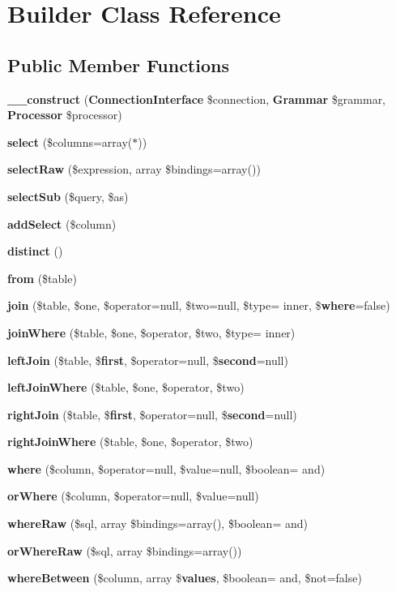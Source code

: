 \section{Builder Class Reference}
\label{class_illuminate_1_1_database_1_1_query_1_1_builder}
\subsection*{Public Member Functions}
\begin{DoxyCompactItemize}
\item 
{\bf \+\_\+\+\_\+construct} ({\bf Connection\+Interface} \$connection, {\bf Grammar} \$grammar, {\bf Processor} \$processor)
\item 
{\bf select} (\$columns=array(\textquotesingle{}$\ast$\textquotesingle{}))
\item 
{\bf select\+Raw} (\$expression, array \$bindings=array())
\item 
{\bf select\+Sub} (\$query, \$as)
\item 
{\bf add\+Select} (\$column)
\item 
{\bf distinct} ()
\item 
{\bf from} (\$table)
\item 
{\bf join} (\$table, \$one, \$operator=null, \$two=null, \$type= \textquotesingle{}inner\textquotesingle{}, \${\bf where}=false)
\item 
{\bf join\+Where} (\$table, \$one, \$operator, \$two, \$type= \textquotesingle{}inner\textquotesingle{})
\item 
{\bf left\+Join} (\$table, \${\bf first}, \$operator=null, \${\bf second}=null)
\item 
{\bf left\+Join\+Where} (\$table, \$one, \$operator, \$two)
\item 
{\bf right\+Join} (\$table, \${\bf first}, \$operator=null, \${\bf second}=null)
\item 
{\bf right\+Join\+Where} (\$table, \$one, \$operator, \$two)
\item 
{\bf where} (\$column, \$operator=null, \$value=null, \$boolean= \textquotesingle{}and\textquotesingle{})
\item 
{\bf or\+Where} (\$column, \$operator=null, \$value=null)
\item 
{\bf where\+Raw} (\$sql, array \$bindings=array(), \$boolean= \textquotesingle{}and\textquotesingle{})
\item 
{\bf or\+Where\+Raw} (\$sql, array \$bindings=array())
\item 
{\bf where\+Between} (\$column, array \${\bf values}, \$boolean= \textquotesingle{}and\textquotesingle{}, \$not=false)

\end{DoxyCompactItemize}

